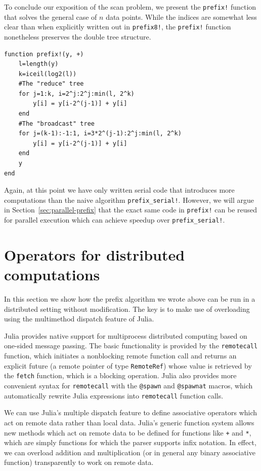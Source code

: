 \documentclass{sig-alternate}
\newcommand{\code}[1]{\texttt{#1}}
\begin{document}
To conclude our exposition of the scan problem, we present the \code{prefix!}
function that solves the general case of $n$ data points. While the indices are
somewhat less clear than when explicitly written out in \code{prefix8!}, the
\code{prefix!} function nonetheless preserves the double tree structure.

\begin{verbatim}
function prefix!(y, +)
    l=length(y)
    k=iceil(log2(l))
    #The "reduce" tree
    for j=1:k, i=2^j:2^j:min(l, 2^k)
        y[i] = y[i-2^(j-1)] + y[i]
    end
    #The "broadcast" tree
    for j=(k-1):-1:1, i=3*2^(j-1):2^j:min(l, 2^k)
        y[i] = y[i-2^(j-1)] + y[i]
    end
    y
end
\end{verbatim}

Again, at this point we have only written serial code that introduces more
computations than the naive algorithm \code{prefix\allowbreak\_serial!}.
However, we will argue in Section~\ref{sec:parallel-prefix} that the exact same
code in \code{prefix!} can be reused for parallel execution which can achieve
speedup over \code{prefix\allowbreak\_serial!}.

\section{Operators for distributed computations}

In this section we show how the prefix algorithm we wrote above can be run in a
distributed setting without modification. The key is to make use of overloading
using the multimethod dispatch feature of Julia.

Julia provides native support for multiprocess distributed computing based on
one-sided message passing. The basic functionality is provided by the
\code{remotecall} function, which initiates a nonblocking remote function call
and returns an explicit future (a remote pointer of type \code{RemoteRef})
whose value is retrieved by the \code{fetch} function, which is a blocking
operation. Julia also provides more convenient syntax for \code{remotecall}
with the \code{@spawn} and \code{@spawnat} macros, which automatically rewrite
Julia expressions into \code{remotecall} function calls.

We can use Julia's multiple dispatch feature to define associative operators
which act on remote data rather than local data. Julia's generic function
system allows new methods which act on remote data to be defined for functions
like \code{+} and \code{*}, which are simply functions for which the parser
supports infix notation. In effect, we can overload addition and multiplication
(or in general any binary associative function) transparently to work on remote
data.
\end{document}
